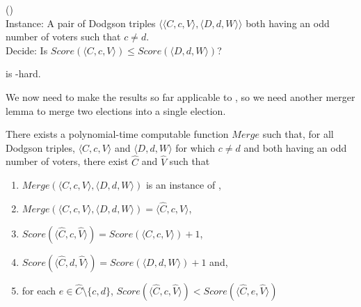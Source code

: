 \begin{problem}{ ()} \\
    \tab Instance: A pair of Dodgson triples
$\langle \langle C,c,V \rangle, \langle D,d,W \rangle \rangle$
both having an odd number of voters such that $c\neq d$.\\
    \tab Decide: Is 
$Score(\langle C,c,V \rangle)\leq Score(\langle D,d,W \rangle)$?
\end{problem}

\begin{lemma} \label{lem:2er}
     is \tp-hard.
\end{lemma}

We now need to make the results so far applicable to 
, so we need another merger lemma to
merge two elections into a single election.

\begin{lemma} \label{lem:merge2}
There exists a polynomial-time computable function $Merge$
    such that, for all Dodgson triples,
    $\langle C,c,V \rangle$ and $\langle D,d,W \rangle$ 
    for which $c\neq d$ and both having an odd number of voters,
    there exist $\hat{C}$ and $\hat{V}$ such that
    \begin{enumerate}
        \item $Merge(\langle C,c,V \rangle, \langle D,d,W \rangle)$
        is an instance of , 
        \item $Merge(\langle C,c,V \rangle, \langle D,d,W \rangle)
        = \langle \hat{C},c,\hat{V} \rangle$,
        \item $Score(\langle \hat{C},c,\hat{V} \rangle) =
        Score(\langle C,c,V \rangle) + 1$,
        \item $Score(\langle \hat{C},d,\hat{V} \rangle) =
        Score(\langle D,d,W \rangle) + 1$ and,
        \item for each $e \in \hat{C}\setminus \{c,d\}$, 
        $Score(\langle \hat{C},c,\hat{V} \rangle) < 
        Score(\langle \hat{C},e,\hat{V} \rangle)$
    \end{enumerate}
\end{lemma}




